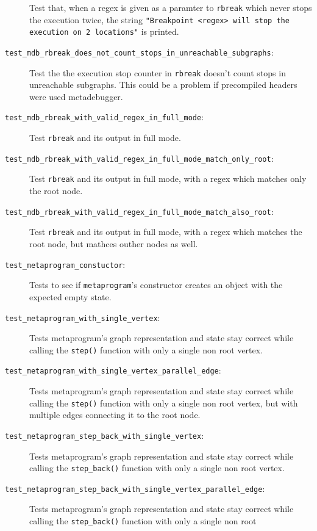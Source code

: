 \begin{description}
        Test that, when a regex is given as a paramter to \texttt{rbreak} which
        never stops the execution twice, the string
        \texttt{"Breakpoint <regex> will stop the execution on 2 locations"} is
        printed.
    \item[\texttt{test\_mdb\_rbreak\_does\_not\_count\_stops\_in\_unreachable\_subgraphs}:]
        Test the the execution stop counter in \texttt{rbreak} doesn't count
        stops in unreachable subgraphs. This could be a problem if precompiled
        headers were used metadebugger.
    \item[\texttt{test\_mdb\_rbreak\_with\_valid\_regex\_in\_full\_mode}:]
        Test \texttt{rbreak} and its output in full mode.
    \item[\texttt{test\_mdb\_rbreak\_with\_valid\_regex\_in\_full\_mode\_match\_only\_root}:]
        Test \texttt{rbreak} and its output in full mode, with a regex which
        matches only the root node.
    \item[\texttt{test\_mdb\_rbreak\_with\_valid\_regex\_in\_full\_mode\_match\_also\_root}:]
        Test \texttt{rbreak} and its output in full mode, with a regex which
        matches the root node, but mathces outher nodes as well.
    \item[\texttt{test\_metaprogram\_constuctor}:]
        Tests to see if \texttt{metaprogram}'s constructor creates an object
        with the expected empty state.
    \item[\texttt{test\_metaprogram\_with\_single\_vertex}:]
        Tests metaprogram's graph representation and state stay correct while
        calling the \texttt{step()} function with only a single non root
        vertex.
    \item[\texttt{test\_metaprogram\_with\_single\_vertex\_parallel\_edge}:]
        Tests metaprogram's graph representation and state stay correct while
        calling the \texttt{step()} function with only a single non root
        vertex, but with multiple edges connecting it to the root node.
    \item[\texttt{test\_metaprogram\_step\_back\_with\_single\_vertex}:]
        Tests metaprogram's graph representation and state stay correct while
        calling the \texttt{step\_back()} function with only a single non root
        vertex.
    \item[\texttt{test\_metaprogram\_step\_back\_with\_single\_vertex\_parallel\_edge}:]
        Tests metaprogram's graph representation and state stay correct while
        calling the \texttt{step\_back()} function with only a single non root

\end{description}
